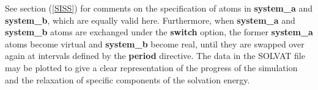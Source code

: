 See section (\ref{SISS}) for comments on the specification of atoms in {\bf
  system\_a} and {\bf system\_b}, which are equally valid here.  Furthermore,
when {\bf system\_a} and {\bf system\_b} atoms are exchanged under the {\bf
  switch} option, the former {\bf system\_a} atoms become virtual and {\bf
  system\_b} become real, until they are swapped over again at intervals
defined by the {\bf period} directive. The data in the SOLVAT file may be
plotted to give a clear representation of the progress of the simulation and
the relaxation of specific components of the solvation energy.



